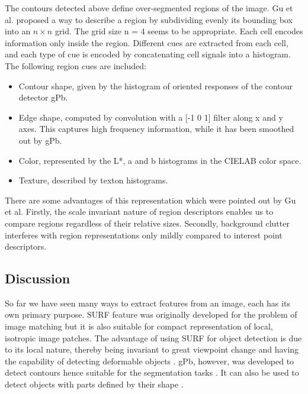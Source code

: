 \documentclass{SMBV12}
\begin{document}
The contours detected above define over-segmented regions of the image. Gu et al. \cite{gu2009recognition} proposed a way to describe a region by subdividing evenly its bounding box into an $n \times n$ grid. The grid size n = 4 seems to be appropriate. Each cell encodes information only inside the region. Different cues are extracted from each cell, and each type of cue is encoded by concatenating cell signals into a histogram. The following region cues are included:

\begin{itemize}
\item Contour shape, given by the histogram of oriented responses of the contour detector gPb.
\item Edge shape, computed by convolution with a [-1 0 1] filter along x and y axes. This captures high frequency information, while it has been smoothed out by gPb.
\item Color, represented by the L*, a and b histograms in the CIELAB color space.
\item Texture, described by texton histograms.
\end{itemize}

There are some advantages of this representation which were pointed out by Gu et al. Firstly, the scale invariant nature of region descriptors enables us to compare regions regardless of their relative sizes. Secondly, background clutter interferes with region representations only mildly compared to interest point descriptors.


\subsection{Discussion}

So far we have seen many ways to extract features from an image, each has its own primary purpose. SURF feature was originally developed for the problem of image matching but it is also suitable for compact representation of local, isotropic image patches. The advantage of using SURF for object detection is due to its local nature, thereby being invariant to great viewpoint change and having the capability of detecting deformable objects \cite{VijayGrauman2011}. gPb, however, was developed to detect contours hence suitable for the segmentation tasks \cite{arbelaez2009contours} \cite{gu2009recognition}. It can also be used to detect objects with parts defined by their shape \cite{VijayGrauman2011} \cite{gu2009recognition}.
\end{document}
